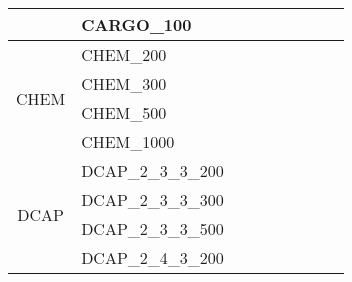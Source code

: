 \begin{table}[]
{\begin{tabular}{|c|l|ll|ll|l|l|l|}
			& CARGO\_100                    &                                 &                                &                                  &                                 &                                    &                            &                            \\ \hline
			\multirow{4}{*}{CHEM}    & CHEM\_200                     &                                 &                                &                                  &                                 &                                    &                            &                            \\
			& CHEM\_300                     &                                 &                                &                                  &                                 &                                    &                            &                            \\
			& CHEM\_500                     &                                 &                                &                                  &                                 &                                    &                            &                            \\
			& CHEM\_1000                    &                                 &                                &                                  &                                 &                                    &                            &                            \\ \hline
			\multirow{12}{*}{DCAP}   & DCAP\_2\_3\_3\_200            &                                 &                                &                                  &                                 &                                    &                            &                            \\
			& DCAP\_2\_3\_3\_300            &                                 &                                &                                  &                                 &                                    &                            &                            \\
			& DCAP\_2\_3\_3\_500            &                                 &                                &                                  &                                 &                                    &                            &                            \\
			& DCAP\_2\_4\_3\_200            &                                 &                                &                                  &                                 &                                    &                            &                            \\

\end{tabular}}
\end{table}
